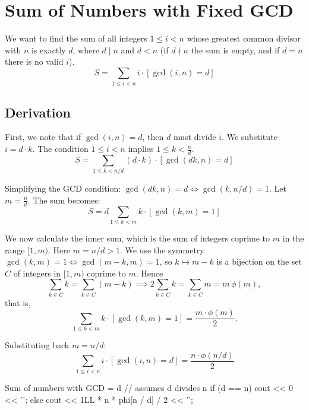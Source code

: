 \documentclass[11pt]{article}
\begin{document}
\pagebreak
\section{Sum of Numbers with Fixed GCD}
\label{sec:sum_fixed_gcd}

We want to find the sum of all integers $1 \le i < n$ whose greatest common divisor with $n$ is exactly $d$, where $d \mid n$ and $d < n$ (if $d \nmid n$ the sum is empty, and if $d = n$ there is no valid $i$).
\[ S = \sum_{1 \le i < n} i \cdot [\gcd(i, n) = d] \]

\subsection{Derivation}

\begin{derivation}
    First, we note that if $\gcd(i, n) = d$, then $d$ must divide $i$. We substitute $i = d \cdot k$. The condition $1 \le i < n$ implies $1 \le k < \frac{n}{d}$.
    \[ S = \sum_{1 \le k < n/d} (d \cdot k) \cdot [\gcd(dk, n) = d] \]

    Simplifying the GCD condition: $\gcd(dk, n) = d \iff \gcd(k, n/d) = 1$.
    Let $m = \frac{n}{d}$. The sum becomes:
    \[ S = d \sum_{1 \le k < m} k \cdot [\gcd(k, m) = 1] \]

    We now calculate the inner sum, which is the sum of integers coprime to $m$ in the range $[1, m)$.
    Here $m = n/d > 1$. We use the symmetry $\gcd(k, m) = 1 \iff \gcd(m-k, m) = 1$, so $k \mapsto m-k$ is a bijection on the set $C$ of integers in $[1,m)$ coprime to $m$. Hence
    \[ \sum_{k \in C} k = \sum_{k \in C} (m-k) \implies 2\sum_{k \in C} k = \sum_{k \in C} m = m\,\phi(m), \]
    that is,
    \[ \sum_{1 \le k < m} k \cdot [\gcd(k, m) = 1] = \frac{m \cdot \phi(m)}{2}. \]
\end{derivation}

\begin{resultbox}
    Substituting back $m = n/d$:
    \begin{equation}
        \sum_{1 \le i < n} i \cdot [\gcd(i, n) = d] = \frac{n \cdot \phi(n/d)}{2}
        \label{eq:sum_gcd_d}
    \end{equation}
\end{resultbox}

\begin{vscode}{Sum of numbers with GCD = d}
// assumes d divides n
if (d == n)
    cout << 0 << '\n';
else
    cout << 1LL * n * phi[n / d] / 2 << '\n';
\end{vscode}
\end{document}
